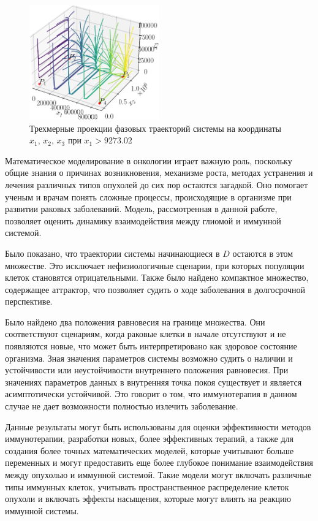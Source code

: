 \documentclass[14pt,a4paper]{extarticle}
\begin{document}
\begin{example}
		\begin{figure}[h]
			\centering
			\includegraphics[width=0.50\textwidth]{media/Figure_14.png}
			\caption{Трехмерные проекции фазовых траекторий системы на координаты $x_1,\, x_2,\, x_3$ при $x_1 > 9273.02$}
			\label{fig:model_K5_new}
		\end{figure}
	\end{example}
	
	\begin{results}
	Математическое моделирование в онкологии играет важную роль, поскольку общие знания о причинах возникновения, механизме роста, методах устранения и лечения различных типов опухолей до сих пор остаются загадкой. Оно помогает ученым и врачам понять сложные процессы, происходящие в организме при развитии раковых заболеваний. Модель, рассмотренная в данной работе, позволяет оценить динамику взаимодействия между глиомой и иммунной системой.
	
	Было показано, что траектории системы начинающиеся в $D$ остаются в этом множестве. Это исключает нефизиологичные сценарии, при которых популяции клеток становятся отрицательными. Также было найдено компактное множество, содержащее аттрактор, что позволяет судить о ходе заболевания в долгосрочной перспективе.
	
	Было найдено два положения равновесия на границе множества. Они соответствуют сценариям, когда раковые клетки в начале отсутствуют и не появляются новые, что может быть интерпретировано как здоровое состояние организма. Зная значения параметров системы возможно судить о наличии и устойчивости или неустойчивости внутреннего положения равновесия. При значениях параметров данных в \cite{model_params} внутренняя точка покоя существует и является асимптотически устойчивой. Это говорит о том, что иммунотерапия в данном случае не дает возможности полностью излечить заболевание. 
	
	Данные результаты могут быть использованы для оценки эффективности методов иммунотерапии, разработки новых, более эффективных терапий, а также для создания более точных математических моделей, которые учитывают больше переменных и могут предоставить еще более глубокое понимание взаимодействия между опухолью и иммунной системой. Такие модели могут включать различные типы иммунных клеток, учитывать пространственное распределение клеток опухоли и включать эффекты насыщения, которые могут влиять на реакцию иммунной системы.
	\end{results}
	
\end{document}
